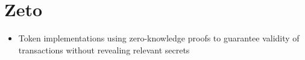 \section{Zeto}

\begin{itemize}
  \item Token implementations using zero-knowledge proofs to guarantee validity of transactions without revealing relevant secrets
\end{itemize}